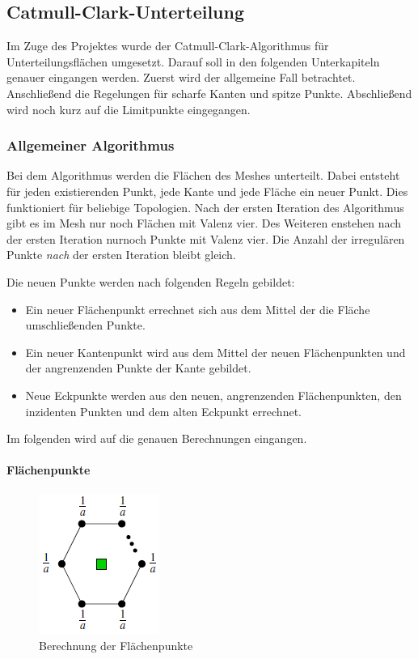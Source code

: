 \subsection{Catmull-Clark-Unterteilung}
Im Zuge des Projektes wurde der Catmull-Clark-Algorithmus für Unterteilungsflächen umgesetzt. 
Darauf soll in den folgenden Unterkapiteln genauer eingangen werden. 
Zuerst wird der allgemeine Fall betrachtet. 
Anschließend die Regelungen für scharfe Kanten und spitze Punkte. 
Abschließend wird noch kurz auf die Limitpunkte eingegangen.

\subsubsection{Allgemeiner Algorithmus}
Bei dem Algorithmus werden die Flächen des Meshes unterteilt. 
Dabei entsteht für jeden existierenden Punkt, jede Kante und jede Fläche ein neuer Punkt.
Dies funktioniert für beliebige Topologien. 
Nach der ersten Iteration des Algorithmus gibt es im Mesh nur noch Flächen mit Valenz vier.
Des Weiteren enstehen nach der ersten Iteration nurnoch Punkte mit Valenz vier. 
Die Anzahl der irregulären Punkte \emph{nach} der ersten Iteration bleibt gleich.

Die neuen Punkte werden nach folgenden Regeln gebildet:\\
\begin{itemize}
\item Ein neuer Flächenpunkt errechnet sich aus dem Mittel der die Fläche umschließenden Punkte.
\item Ein neuer Kantenpunkt wird aus dem Mittel der neuen Flächenpunkten und der angrenzenden Punkte der Kante gebildet.
\item Neue Eckpunkte werden aus den neuen, angrenzenden Flächenpunkten, den inzidenten Punkten und dem alten Eckpunkt errechnet.
\end{itemize}

Im folgenden wird auf die genauen Berechnungen eingangen.

\paragraph{Flächenpunkte}
\begin{figure}[htpb]
\centering
\includegraphics[scale=0.8]{content/pictures/facepoints.png}
\caption{Berechnung der Flächenpunkte}
\label{fig:facepoints}
\end{figure}

